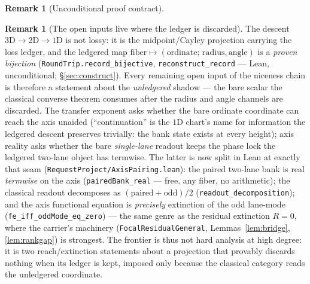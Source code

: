 \documentclass[11pt]{article}
\theoremstyle{definition}
\newtheorem{remark}[theorem]{Remark}
\begin{document}
\begin{remark}[Unconditional proof contract]
\begin{enumerate}
\begin{remark}[The open inputs live where the ledger is discarded]\label{rem:ledgertoll}
The descent $3\mathrm D\to2\mathrm D\to1\mathrm D$ is not lossy: it is the midpoint/Cayley projection
carrying the loss ledger, and the ledgered map $\text{fiber}\mapsto(\text{ordinate};\,\text{radius},
\text{angle})$ is a \emph{proven bijection} (\texttt{RoundTrip.record\_bijective},
\texttt{reconstruct\_record} --- Lean, unconditional; \S\ref{sec:construct}). Every remaining open input of
the niceness chain is therefore a statement about the \emph{unledgered} shadow --- the bare scalar the
classical converse theorem consumes after the radius and angle channels are discarded. The transfer
exponent asks whether the bare ordinate coordinate can reach the axis unaided (``continuation'' is the
$1$D chart's name for information the ledgered descent preserves trivially: the bank state exists at every
height); axis reality asks whether the bare \emph{single-lane} readout keeps the phase lock the ledgered
two-lane object has termwise. The latter is now split in Lean at exactly that seam
(\texttt{RequestProject/AxisPairing.lean}): the paired two-lane bank is real \emph{termwise} on the axis
(\texttt{pairedBank\_real} --- free, any fiber, no arithmetic); the classical readout decomposes as
$(\text{paired}+\text{odd})/2$ (\texttt{readout\_decomposition}); and the axis functional equation is
\emph{precisely} extinction of the odd lane-mode (\texttt{fe\_iff\_oddMode\_eq\_zero}) --- the same genre as
the residual extinction $R=0$, where the carrier's machinery (\texttt{FocalResidualGeneral},
Lemmas~\ref{lem:bridge}, \ref{lem:rankgap}) is strongest. The frontier is thus not hard analysis at high
degree: it is two reach/extinction statements about a projection that provably discards nothing when its
ledger is kept, imposed only because the classical category reads the unledgered coordinate.
\end{remark}


\end{enumerate}
\end{remark}
\end{document}
